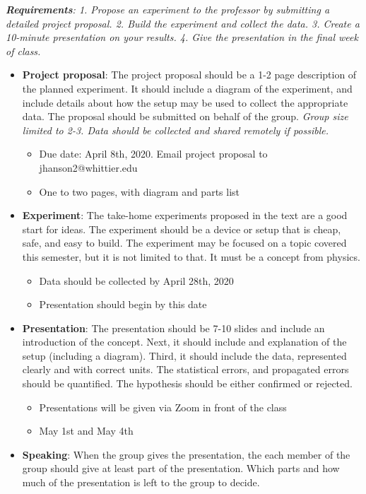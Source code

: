 \documentclass[10pt]{article}
\begin{document}
\maketitle

\noindent
\textit{\textbf{Requirements}: 1. Propose an experiment to the professor by submitting a detailed project proposal.  2. Build the experiment and collect the data.  3. Create a 10-minute presentation on your results.  4. Give the presentation in the final week of class.} \\
\begin{itemize}
\item\textbf{ Project proposal}: The project proposal should be a 1-2 page description of the planned experiment.  It should include a diagram of the experiment, and include details about how the setup may be used to collect the appropriate data.  The proposal should be submitted on behalf of the group.  \textit{Group size limited to 2-3.  Data should be collected and shared remotely if possible.}
\begin{itemize}
\item Due date: April 8th, 2020.  Email project proposal to jhanson2@whittier.edu
\item One to two pages, with diagram and parts list
\end{itemize}
\item \textbf{Experiment}: The take-home experiments proposed in the text are a good start for ideas.  The experiment should be a device or setup that is cheap, safe, and easy to build.  The experiment may be focused on a topic covered this semester, but it is not limited to that.  It must be a concept from physics.
\begin{itemize}
\item Data should be collected by April 28th, 2020
\item Presentation should begin by this date
\end{itemize}
\item \textbf{Presentation}: The presentation should be 7-10 slides and include an introduction of the concept.  Next, it should include and explanation of the setup (including a diagram).  Third, it should include the data, represented clearly and with correct units.  The statistical errors, and propagated errors should be quantified.  The hypothesis should be either confirmed or rejected.
\begin{itemize}
\item Presentations will be given via Zoom in front of the class
\item May 1st and May 4th
\end{itemize}
\item \textbf{Speaking}: When the group gives the presentation, the each member of the group should give at least part of the presentation.  Which parts and how much of the presentation is left to the group to decide.
\end{itemize}
\end{document}
